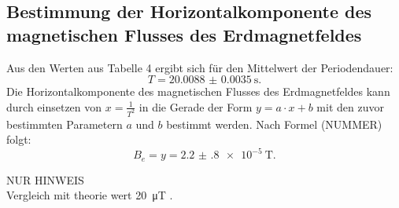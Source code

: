 \subsection{Bestimmung der Horizontalkomponente des magnetischen Flusses des Erdmagnetfeldes}

Aus den Werten aus Tabelle 4 ergibt sich für den Mittelwert der Periodendauer:
\begin{equation}
	T = \SI{20.0088(35)}{\second}\text{.}
\end{equation}
Die Horizontalkomponente des magnetischen Flusses des Erdmagnetfeldes kann durch einsetzen von $x=\frac{1}{T^2}$ in die Gerade der Form $y = a \cdot x +b$ mit den zuvor bestimmten Parametern $a$ und $b$ bestimmt werden. Nach Formel (NUMMER) folgt:
\begin{equation}
	B_e = y = \SI{ 2.2(8)e-5}{\tesla}\text{.}
\end{equation}

NUR HINWEIS\\
Vergleich mit theorie wert \SI{20}{\micro\tesla} \cite{Erdmagnetfeld}.
